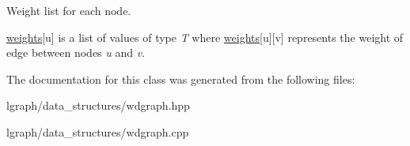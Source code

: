Weight list for each node. 

\hyperlink{classlgraph_1_1wxgraph_a6f8c983edc82913c2d78b7bc871defe8}{weights}\mbox{[}u\mbox{]} is a list of values of type {\itshape T} where \hyperlink{classlgraph_1_1wxgraph_a6f8c983edc82913c2d78b7bc871defe8}{weights}\mbox{[}u\mbox{]}\mbox{[}v\mbox{]} represents the weight of edge between nodes {\itshape u} and {\itshape v}. 

The documentation for this class was generated from the following files\+:\begin{DoxyCompactItemize}
\item 
lgraph/data\+\_\+structures/wdgraph.\+hpp\item 
lgraph/data\+\_\+structures/wdgraph.\+cpp\end{DoxyCompactItemize}
